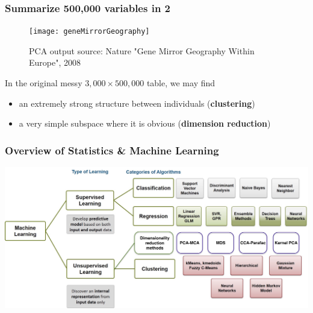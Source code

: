 \documentclass{beamer}\usepackage[]{graphicx}\usepackage[]{color}
\begin{document}
\begin{frame}
  \frametitle{Summarize 500,000 variables in 2}

  \begin{figure}
    \centering
      \texttt{[image: geneMirrorGeography]}
    \caption{PCA output {\tiny source: Nature "Gene  Mirror Geography Within  Europe", 2008}}
  \end{figure}

  In the original messy $3,000 \times 500,000$ table, we may find
    \begin{itemize}
      \item an extremely strong structure between individuals (\alert{\bf clustering})
      \item a very simple subspace where it is obvious (\alert{\bf dimension reduction})
    \end{itemize}

\end{frame}

\begin{frame}
	\frametitle{Overview of Statistics \& Machine Learning}

	\begin{center}
		\includegraphics[width=\textwidth]{figures/Learning+Types.jpg}
	\end{center}

\end{frame}
\end{document}
